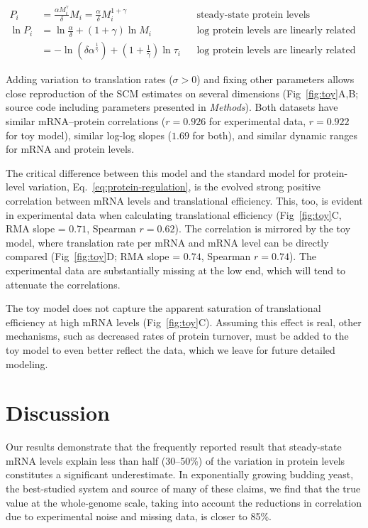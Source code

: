 \documentclass[10pt]{article}
\begin{document}
\begin{align*}
P_i &= \frac{\alpha M_i^\gamma}{\delta}M_i =  \frac{\alpha}{\delta} M_i^{1+\gamma}&&\text{steady-state protein levels}\\
\ln P_i &= \ln \frac{\alpha}{\delta} + (1+\gamma) \ln M_i &&\text{log protein levels are linearly related to log mRNA levels}\\
&=  -\ln \left(\delta\alpha^{\frac{1}{\gamma}}\right) + \left(1 + \frac{1}{\gamma}\right)\ln \tau_i&&\text{log protein levels are linearly related to log translation rates}
\end{align*}

Adding variation to translation rates ($\sigma>0$) and fixing other parameters allows close reproduction of the SCM estimates on several dimensions (Fig~\ref{fig:toy}A,B; source code including parameters presented in \emph{Methods}). Both datasets have similar mRNA--protein correlations ($r=0.926$ for experimental data, $r=0.922$ for toy model), similar log-log slopes ($1.69$ for both), and similar dynamic ranges for mRNA and protein levels.

The critical difference between this model and the standard model for protein-level variation, Eq.~\ref{eq:protein-regulation}, is the evolved strong positive correlation between mRNA levels and translational efficiency. This, too, is evident in experimental data when calculating translational efficiency (Fig~\ref{fig:toy}C, RMA slope = $0.71$, Spearman $r=0.62$). The correlation is mirrored by the toy model, where translation rate per mRNA and mRNA level can be directly compared (Fig~\ref{fig:toy}D; RMA slope = $0.74$, Spearman $r=0.74$). The experimental data are substantially missing at the low end, which will tend to attenuate the correlations.

The toy model does not capture the apparent saturation of translational efficiency at high mRNA levels (Fig~\ref{fig:toy}C). Assuming this effect is real, other mechanisms, such as decreased rates of protein turnover, must be added to the toy model to even better reflect the data, which we leave for future detailed modeling.

\section*{Discussion}

Our results demonstrate that the frequently reported result that
steady-state mRNA levels explain less than half (30--50\%) of the
variation in protein levels constitutes a significant underestimate. In exponentially growing budding yeast, the best-studied system and source of many of these claims, we find that the true
value at the whole-genome scale, taking into account the reductions in correlation due to
experimental noise and missing data, is closer to 85\%. 
\end{document}

